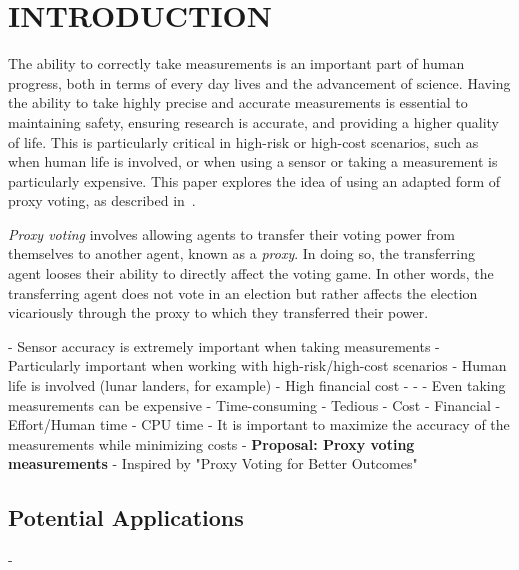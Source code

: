 %
%

\chapter{INTRODUCTION}\label{ch:introduction}
\thispagestyle{empty}

The ability to correctly take measurements is an important part of human
progress, both in terms of every day lives and the advancement of science.
Having the ability to take highly precise and accurate measurements is essential
to maintaining safety, ensuring research is accurate, and providing a higher
quality of life.
This is particularly critical in high-risk or high-cost scenarios, such as when
human life is involved, or when using a sensor or taking a measurement is
particularly expensive.  %
This paper explores the idea of using an adapted form of proxy voting, as
described in~\cite{Cohensius2017}.

\textit{Proxy voting} involves allowing agents to transfer their voting power
from themselves to another agent, known as a \textit{proxy}\cite[para. 1.4]
{Cohensius2017}.
In doing so, the transferring agent looses their ability to directly affect the
voting game.
In other words, the transferring agent does not vote in an election but rather
affects the election vicariously through the proxy to which they transferred
their power.





- Sensor accuracy is extremely important when taking measurements
- Particularly important when working with high-risk/high-cost scenarios
    - Human life is involved (lunar landers, for example)
    - High financial cost
    - %
    - %
- Even taking measurements can be expensive
    - Time-consuming
    - Tedious
    - Cost
        - Financial
        - Effort/Human time
        - CPU time
- It is important to maximize the accuracy of the measurements while minimizing
  costs
    - \textbf{Proposal: Proxy voting measurements}
        - Inspired by "Proxy Voting for Better Outcomes"\cite{Cohensius2017}

\section{Potential Applications}\label{sec:potential-applications}
- %

